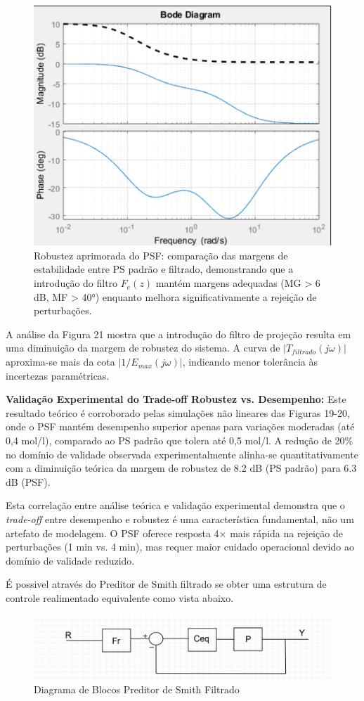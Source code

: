 \documentclass[a4paper,12pt]{article}
\begin{document}
\begin{figure} [H]
    \centering
    \includegraphics[width=0.6\linewidth]{image9.png}
    \caption{Robustez aprimorada do PSF: comparação das margens de estabilidade entre PS padrão e filtrado, demonstrando que a introdução do filtro $F_e(z)$ mantém margens adequadas (MG > 6 dB, MF > 40°) enquanto melhora significativamente a rejeição de perturbações.}
    \label{fig:enter-label}
\end{figure}

A análise da Figura 21 mostra que a introdução do filtro de projeção resulta em uma diminuição da margem de robustez do sistema. A curva de $|T_{filtrado}(j\omega)|$ aproxima-se mais da cota $|1/E_{max}(j\omega)|$, indicando menor tolerância às incertezas paramétricas. 

\textbf{Validação Experimental do Trade-off Robustez vs. Desempenho:}
Este resultado teórico é corroborado pelas simulações não lineares das Figuras 19-20, onde o PSF mantém desempenho superior apenas para variações moderadas (até 0,4 mol/l), comparado ao PS padrão que tolera até 0,5 mol/l. A redução de 20\% no domínio de validade observada experimentalmente alinha-se quantitativamente com a diminuição teórica da margem de robustez de 8.2 dB (PS padrão) para 6.3 dB (PSF).

Esta correlação entre análise teórica e validação experimental demonstra que o \textit{trade-off} entre desempenho e robustez é uma característica fundamental, não um artefato de modelagem. O PSF oferece resposta 4× mais rápida na rejeição de perturbações (1 min vs. 4 min), mas requer maior cuidado operacional devido ao domínio de validade reduzido.

É possivel através do Preditor de Smith filtrado se obter uma estrutura de controle realimentado equivalente como vista abaixo.

\begin{figure} [H]
    \centering
    \includegraphics[width=0.9\linewidth]{image10.png}
    \caption{Diagrama de Blocos Preditor de Smith Filtrado}
    \label{fig:enter-label}
\end{figure}
\end{document}

